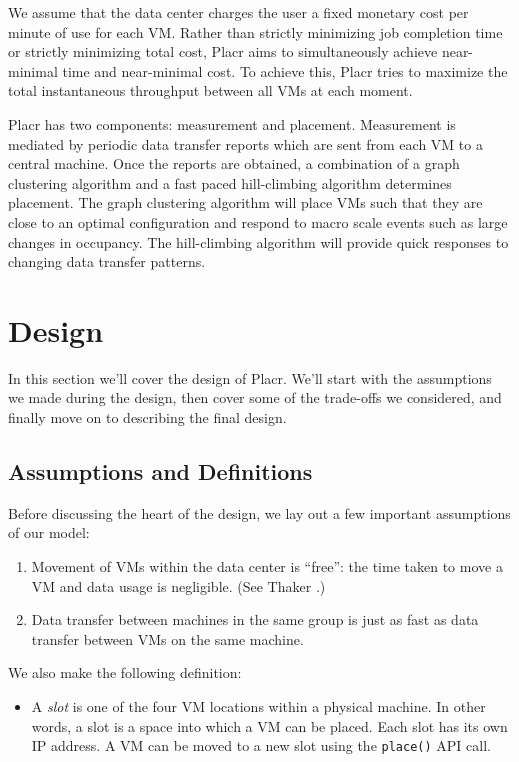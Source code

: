 \documentclass[11pt]{article}
\begin{document}
We assume that the data center charges the user a fixed monetary cost per minute of use for each VM.  Rather than strictly minimizing job completion time or strictly minimizing total cost, Placr aims to simultaneously achieve near-minimal time and near-minimal cost.  To achieve this, Placr tries to maximize the total instantaneous throughput between all VMs at each moment.

Placr has two components: measurement and placement.  Measurement is mediated by periodic data transfer reports which are sent from each VM to a central machine.  Once the reports are obtained, a combination of a graph clustering algorithm and a fast paced hill-climbing algorithm determines placement. The graph clustering algorithm will place VMs such that they are close to an optimal configuration and respond to macro scale events such as large changes in occupancy.  The hill-climbing algorithm will provide quick responses to changing data transfer patterns.

\section{Design}

In this section we'll cover the design of Placr.  We'll start with the assumptions we made during the design, then cover some of the trade-offs we considered, and finally move on to describing the final design.

\subsection{Assumptions and Definitions}
Before discussing the heart of the design, we lay out a few important assumptions of our model:
\begin{enumerate}[noitemsep]
  \item Movement of VMs within the data center is ``free'': the time taken to move a VM and data usage is negligible.  (See Thaker \cite{Piazza}.)
  \item Data transfer between machines in the same group is just as fast as data transfer between VMs on the same machine.
\end{enumerate}
We also make the following definition:
\begin{itemize}
  \item A {\em slot} is one of the four VM locations within a physical machine.  In other words, a slot is a space into which a VM can be placed.  Each slot has its own IP address.  A VM can be moved to a new slot using the {\tt place()} API call.
\end{itemize}
\end{document}
